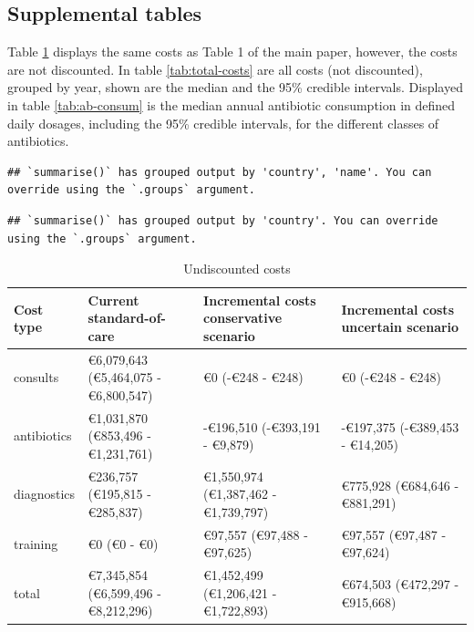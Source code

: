 \documentclass[
]{article}
\begin{document}
\hypertarget{supplemental-tables}{%
\subsection{Supplemental tables}\label{supplemental-tables}}

Table \ref{tab:undiscounted-costs} displays the same costs as Table 1 of the main paper, however, the costs are not discounted. In table \ref{tab:total-costs} are all costs (not discounted), grouped by year, shown are the median and the 95\% credible intervals. Displayed in table \ref{tab:ab-consum} is the median annual antibiotic consumption in defined daily dosages, including the 95\% credible intervals, for the different classes of antibiotics.

\begin{verbatim}
## `summarise()` has grouped output by 'country', 'name'. You can override using the `.groups` argument.
\end{verbatim}

\begin{verbatim}
## `summarise()` has grouped output by 'country'. You can override using the `.groups` argument.
\end{verbatim}

\begingroup\fontsize{7}{9}\selectfont

\begin{longtable}[t]{llll}
\caption{\label{tab:undiscounted-costs}Undiscounted costs}\\
\toprule
Cost type & Current standard-of-care & Incremental costs conservative scenario & Incremental costs uncertain scenario\\
\midrule
consults & €6,079,643 (€5,464,075 - €6,800,547) & €0 (-€248 - €248) & €0 (-€248 - €248)\\
antibiotics & €1,031,870 (€853,496 - €1,231,761) & -€196,510 (-€393,191 - €9,879) & -€197,375 (-€389,453 - €14,205)\\
diagnostics & €236,757 (€195,815 - €285,837) & €1,550,974 (€1,387,462 - €1,739,797) & €775,928 (€684,646 - €881,291)\\
training & €0 (€0 - €0) & €97,557 (€97,488 - €97,625) & €97,557 (€97,487 - €97,624)\\
total & €7,345,854 (€6,599,496 - €8,212,296) & €1,452,499 (€1,206,421 - €1,722,893) & €674,503 (€472,297 - €915,668)\\
\bottomrule
\end{longtable}
\endgroup{}
\end{document}
